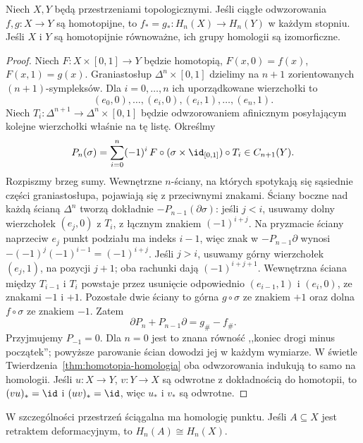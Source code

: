 \begin{twierdzenie}
\label{thm:homotopia-singularna}
Niech $X,Y$ będą przestrzeniami topologicznymi.
Jeśli ciągłe odwzorowania $f,g:X\to Y$ są homotopijne, to
$f_*=g_*:H_n(X)\to H_n(Y)$ w każdym stopniu.
Jeśli $X$ i $Y$ są homotopijnie równoważne,
ich grupy homologii są izomorficzne.
\end{twierdzenie}
\begin{proof}
Niech $F:X\times[0,1]\to Y$ będzie
homotopią, $F(x,0)=f(x)$,
$F(x,1)=g(x)$.
Graniastosłup $\Delta^n\times[0,1]$
dzielimy na $n+1$ zorientowanych
$(n+1)$-sympleksów. Dla $i=0,\ldots,n$
ich uporządkowane wierzchołki to
\[
 (e_0,0),\ldots,(e_i,0),
 (e_i,1),\ldots,(e_n,1).
\]
Niech $T_i:\Delta^{n+1}\to
\Delta^n\times[0,1]$ będzie odwzorowaniem
afinicznym posyłającym kolejne wierzchołki
właśnie na tę listę. Określmy
\[
 P_n(\sigma)=\sum_{i=0}^n(-1)^i\,
 F\circ(\sigma\times\id_{[0,1]})\circ T_i
 \in C_{n+1}(Y).
\]
Rozpiszmy brzeg sumy. Wewnętrzne
$n$-ściany, na których spotykają się
sąsiednie części graniastosłupa,
pojawiają się z przeciwnymi znakami.
Ściany boczne nad każdą ścianą
$\Delta^n$ tworzą dokładnie
$-P_{n-1}(\partial\sigma)$:
jeśli $j<i$, usuwamy dolny wierzchołek $(e_j,0)$
z $T_i$, z łącznym znakiem $(-1)^{i+j}$.
Na pryzmacie ściany naprzeciw $e_j$ punkt podziału ma indeks $i-1$,
więc znak w $-P_{n-1}\partial$ wynosi
$-(-1)^j(-1)^{i-1}=(-1)^{i+j}$.
Jeśli $j>i$, usuwamy górny wierzchołek $(e_j,1)$,
na pozycji $j+1$; oba rachunki dają $(-1)^{i+j+1}$.
Wewnętrzna ściana między $T_{i-1}$ i $T_i$ powstaje
przez usunięcie odpowiednio $(e_{i-1},1)$ i $(e_i,0)$,
ze znakami $-1$ i $+1$.
Pozostałe dwie ściany to górna
$g\circ\sigma$ ze znakiem $+1$
oraz dolna $f\circ\sigma$ ze
znakiem $-1$. Zatem
\begin{equation}\label{eq:prism-identity}
 \partial P_n+P_{n-1}\partial
 =g_\#-f_\#.
\end{equation}
Przyjmujemy $P_{-1}=0$. Dla $n=0$ jest to znana równość
,,koniec drogi minus początek'';
powyższe parowanie ścian dowodzi
jej w każdym wymiarze. W świetle
Twierdzenia~\ref{thm:homotopia-homologia}
oba odwzorowania indukują to samo na homologii.
Jeśli $u:X\to Y$, $v:Y\to X$
są odwrotne z dokładnością do homotopii,
to $(vu)_*=\id$ i $(uv)_*=\id$,
więc $u_*$ i $v_*$ są odwrotne.
\end{proof}

W szczególności przestrzeń ściągalna
ma homologię punktu. Jeśli
$A\subseteq X$ jest retraktem
deformacyjnym, to $H_n(A)\cong H_n(X)$.

